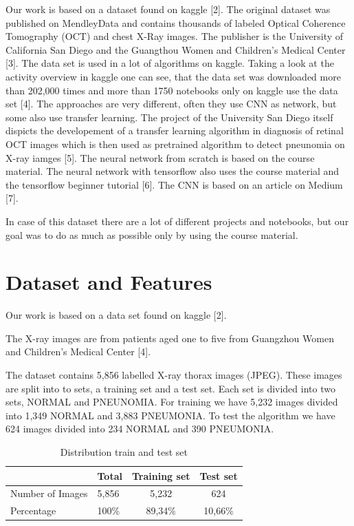 \documentclass{article}
\begin{document}
Our work is based on a dataset found on kaggle [2]. 
The original dataset was published on MendleyData and contains thousands of labeled Optical Coherence Tomography (OCT) and chest X-Ray images. 
The publisher is the University of California San Diego and the Guangthou Women and Children's Medical Center [3]. 
The data set is used in a lot of algorithms on kaggle. 
Taking a look at the activity overview in kaggle one can see, 
that the data set was downloaded more than 202,000 times and more than 1750 notebooks only on kaggle use the data set [4]. 
The approaches are very different, often they use CNN as network, but some also use transfer learning. 
The project of the University San Diego itself dispicts the developement of a transfer learning algorithm 
in diagnosis of retinal OCT images which is then used as pretrained algorithm to detect pneunomia on X-ray iamges [5].
The neural network from scratch is based on the course material. 
The neural network with tensorflow also uses the course material and the tensorflow beginner tutorial [6]. 
The CNN is based on an article on Medium [7].

In case of this dataset there are a lot of different projects and notebooks, 
but our goal was to do as much as possible only by using the course material.

\section{Dataset and Features}
\label{sec:dataset_and_features}

Our work is based on a data set found on kaggle [2].

The X-ray images are from patients aged one to five from Guangzhou Women and Children's Medical Center [4]. 

The dataset contains 5,856 labelled X-ray thorax images (JPEG). 
These images are split into to sets, a training set and a test set. Each set is divided into two sets, 
NORMAL and PNEUNOMIA. For training we have 5,232 images divided into 1,349 NORMAL and 3,883 PNEUMONIA. 
To test the algorithm we have 624 images divided into 234 NORMAL and 390 PNEUMONIA.

\begin{table}[ht]
	\centering
	\begin{tabular}{|l|l|c|c|}
	\hline
	& Total & Training set & Test set \\ \hline \hline
  Number of Images & 5,856 & 5,232    & 624 \\ \hline
  Percentage       & 100\% & 89,34\%  & 10,66\% \\ \hline
	\end{tabular}
	\caption{Distribution train and test set}
	\label{tab:distribution_train_test}
\end{table}
\end{document}
